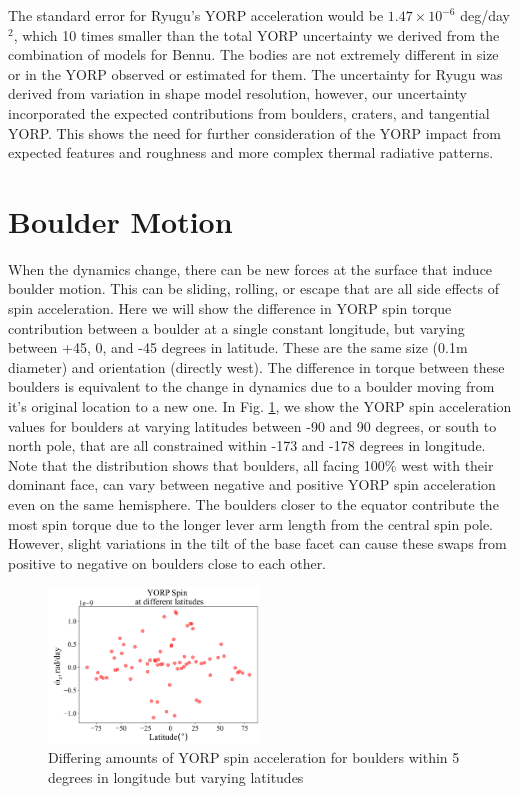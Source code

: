 The standard error for Ryugu's YORP acceleration would be $1.47 \times 10^{-6}$ deg/day$^2$, which 10 times smaller than the total YORP uncertainty we derived from the combination of models for Bennu. The bodies are not extremely different in size or in the YORP observed or estimated for them. The uncertainty for Ryugu was derived from variation in shape model resolution, however, our uncertainty incorporated the expected contributions from boulders, craters, and tangential YORP. This shows the need for further consideration of the YORP impact from expected features and roughness and more complex thermal radiative patterns. 

\section{Boulder Motion}
When the dynamics change, there can be new forces at the surface that induce boulder motion. This can be sliding, rolling, or escape that are all side effects of spin acceleration. Here we will show the difference in YORP spin torque contribution between a boulder at a single constant longitude, but varying between +45, 0, and -45 degrees in latitude. These are the same size (0.1m diameter) and orientation (directly west). The difference in torque between these boulders is equivalent to the change in dynamics due to a boulder moving from it's original location to a new one. In Fig. \ref{fig:motion_nodelta}, we show the YORP spin acceleration values for boulders at varying latitudes between -90 and 90 degrees, or south to north pole, that are all constrained within -173 and -178 degrees in longitude. Note that the distribution shows that boulders, all facing 100\% west with their dominant face, can vary between negative and positive YORP spin acceleration even on the same hemisphere. The boulders closer to the equator contribute the most spin torque due to the longer lever arm length from the central spin pole. However, slight variations in the tilt of the base facet can cause these swaps from positive to negative on boulders close to each other. 

\begin{figure}[H]
    \centering
    \includegraphics[width=0.5\textwidth]{fig/yorp_amt_boulder_motion_bennu.png}
    \caption{Differing amounts of YORP spin acceleration for boulders within 5 degrees in longitude but varying latitudes}
    \label{fig:motion_nodelta}
\end{figure}


